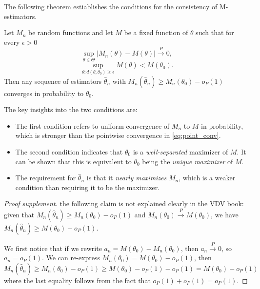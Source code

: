 \documentclass{article}
\begin{document}
The following theorem estiablishes the conditions for the consistency of M-estimators.
\begin{theorem}\label{thm:mle_consistency}
    Let $M_n$ be random functions and let $M$ be a fixed function of $\theta$ such that for every $\epsilon > 0$
    \begin{equation}
        \sup_{\theta \in \Theta} | M_n(\theta) - M(\theta) | \overset{P}{\rightarrow} 0,
    \end{equation}
    \begin{equation}
        \sup_{\theta : d(\theta, \theta_0) \geq \epsilon} M(\theta) < M(\theta_0).
    \end{equation}
    Then any sequence of estimators $\hat{\theta}_n$ with $M_n(\hat{\theta}_n) \geq M_n(\theta_0) - o_P(1)$ converges in probability to $\theta_0$.
\end{theorem}
The key insights into the two conditions are:
\begin{itemize}
    \item The first condition refers to uniform convergence of $M_n$ to $M$ in probability, which is stronger than the pointwise convergence in \ref{eq:point_conv}.
    \item The second condition indicates that $\theta_0$ is a \textit{well-separated} maximizer of $M$. It can be shown that this is equivalent to $\theta_0$ being the \textit{unique maximizer} of $M$.
    \item The requirement for $\hat \theta_n$ is that it \textit{nearly maximizes} $M_n$, which is a weaker condition than requiring it to be the maximizer.
\end{itemize}
\begin{proof}[Proof supplement]
    the following claim is not explained clearly in the VDV book: given that $M_n(\hat{\theta}_n) \geq M_n(\theta_0) - o_P(1)$ and $M_n(\theta_0) \overset{P}{\rightarrow} M(\theta_0)$, we have $M_n(\hat{\theta}_n) \geq M(\theta_0) - o_P(1)$.

    We first notice that if we rewrite $a_n = M(\theta_0) - M_n(\theta_0)$, then $a_n \overset{P}{\rightarrow} 0$, so $a_n = o_P(1)$. We can re-express $M_n(\theta_0) = M(\theta_0) - o_P(1)$, then 
    \begin{equation}
        M_n(\hat{\theta}_n) \geq M_n(\theta_0) - o_P(1) \geq M(\theta_0) - o_P(1) - o_P(1) = M(\theta_0) - o_P(1)
    \end{equation}
    where the last equality follows from the fact that $o_P(1) + o_P(1) = o_P(1)$.
\end{proof}
\end{document}
